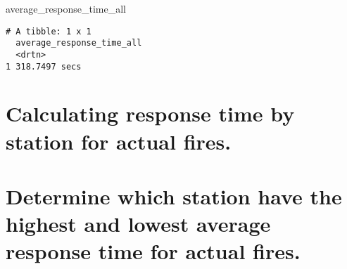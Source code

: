 \documentclass[
  letterpaper,
  DIV=11,
  numbers=noendperiod]{scrartcl}
\newenvironment{Shaded}{\begin{snugshade}}{\end{snugshade}}
\newcommand{\NormalTok}[1]{\textcolor[rgb]{0.00,0.23,0.31}{#1}}
\begin{document}
\begin{Shaded}
\begin{Highlighting}[]
\NormalTok{  average\_response\_time\_all}
\end{Highlighting}
\end{Shaded}

\begin{verbatim}
# A tibble: 1 x 1
  average_response_time_all
  <drtn>                   
1 318.7497 secs            
\end{verbatim}

\section{Calculating response time by station for actual
fires.}\label{calculating-response-time-by-station-for-actual-fires.}

\section{Determine which station have the highest and lowest average
response time for actual
fires.}\label{determine-which-station-have-the-highest-and-lowest-average-response-time-for-actual-fires.}
\end{document}
